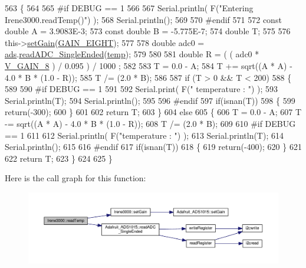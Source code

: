 \begin{DoxyCode}
563 \{
564 
565 \textcolor{preprocessor}{#if DEBUG == 1 }
566 
567     Serial.println( F(\textcolor{stringliteral}{"Entering Irene3000.readTemp()"}) );
568     Serial.println();
569 
570 \textcolor{preprocessor}{#endif}
571 
572     \textcolor{keyword}{const} \textcolor{keywordtype}{double} A = 3.9083E-3;
573     \textcolor{keyword}{const} \textcolor{keywordtype}{double} B = -5.775E-7;
574     \textcolor{keywordtype}{double} T;
575 
576     this->\hyperlink{class_irene3000_aff7c5da186b388e7272e63ff88a20c34}{setGain}(\hyperlink{_cool_adafruit___a_d_s1015_8h_a3d6c0e15829a207b9155890811fa4781af284da818fc21db27c5ffcfaff7047cb}{GAIN\_EIGHT});
577 
578     \textcolor{keywordtype}{double} adc0 = \hyperlink{class_irene3000_a1215e77ba761c9908d80d691f149e135}{ads}.\hyperlink{class_adafruit___a_d_s1015_a40f38b9e1f3ec397c0670dd632510235}{readADC\_SingleEnded}(\hyperlink{_irene3000_8h_a5905d48604152cf57aa6bfa087b49173}{temp});
579 
580 
581     \textcolor{keywordtype}{double} R = ( ( adc0 * \hyperlink{_irene3000_8h_ab7ab16df599d3f0ce29e12791a504891}{V\_GAIN\_8} ) / 0.095 ) / 1000 ;
582 
583     T = 0.0 - A;
584     T += sqrt((A * A) - 4.0 * B * (1.0 - R));
585     T /= (2.0 * B);
586 
587     \textcolor{keywordflow}{if} (T > 0 && T < 200) 
588     \{
589 
590 \textcolor{preprocessor}{    #if DEBUG == 1 }
591 
592         Serial.print( F(\textcolor{stringliteral}{" temperature : "}) );
593         Serial.println(T);
594         Serial.println();
595     
596 \textcolor{preprocessor}{    #endif }
597         \textcolor{keywordflow}{if}(isnan(T))
598         \{
599             \textcolor{keywordflow}{return}(-300);           
600         \}
601 
602         \textcolor{keywordflow}{return} T;
603     \}
604     \textcolor{keywordflow}{else} 
605     \{
606         T = 0.0 - A;
607         T -= sqrt((A * A) - 4.0 * B * (1.0 - R));
608         T /= (2.0 * B);
609     
610 \textcolor{preprocessor}{    #if DEBUG == 1 }
611     
612         Serial.println( F(\textcolor{stringliteral}{"temperature : "}) );
613         Serial.println(T);
614         Serial.println();
615     
616 \textcolor{preprocessor}{    #endif}
617         \textcolor{keywordflow}{if}(isnan(T))
618         \{
619             \textcolor{keywordflow}{return}(-400);           
620         \}
621 
622         \textcolor{keywordflow}{return} T;
623     \}
624 
625 \}
\end{DoxyCode}
Here is the call graph for this function\+:\nopagebreak
\begin{figure}[H]
\begin{center}
\leavevmode
\includegraphics[width=350pt]{d6/d03/class_irene3000_a80bc6dfea106dc3bc54fa20204d4d5dc_cgraph}
\end{center}
\end{figure}
